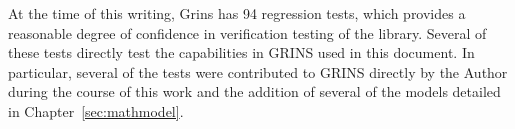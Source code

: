 
At the time of this writing, Grins has 94 regression tests, which
provides a reasonable degree of confidence in verification testing of
the library. Several of these tests directly test the capabilities in
GRINS used in this document. In particular, several of the tests were
contributed to GRINS directly by the Author during the course of this
work and the addition of several of the models detailed in
Chapter~\ref{sec:mathmodel}. 


